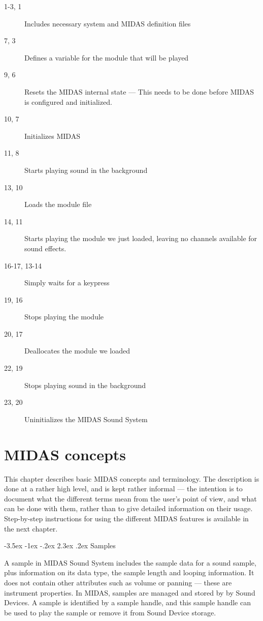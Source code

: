 \documentclass[a4paper,12pt,oneside]{book}
\makeatletter
\renewcommand\section{\@startsection {section}{1}{-20pt}%
                                   {-3.5ex \@plus -1ex \@minus -.2ex}%
                                   {2.3ex \@plus.2ex}%
                                   {\normalfont\Large\bfseries}}
\makeatother
\begin{document}
\begin{description}
    \item [1-3, 1] Includes necessary system and MIDAS definition files
    \item [7, 3] Defines a variable for the module that will be played
    \item [9, 6] Resets the MIDAS internal state --- This needs to be done
        before MIDAS is configured and initialized.
    \item [10, 7] Initializes MIDAS
    \item [11, 8] Starts playing sound in the background
    \item [13, 10] Loads the module file
    \item [14, 11] Starts playing the module we just loaded, leaving no
        channels available for sound effects.
    \item [16-17, 13-14] Simply waits for a keypress
    \item [19, 16] Stops playing the module
    \item [20, 17] Deallocates the module we loaded
    \item [22, 19] Stops playing sound in the background
    \item [23, 20] Uninitializes the MIDAS Sound System
\end{description}




\chapter{MIDAS concepts}

This chapter describes basic MIDAS concepts and terminology. The description
is done at a rather high level, and is kept rather informal --- the intention
is to document what the different terms mean from the user's point of view,
and what can be done with them, rather than to give detailed information on
their usage. Step-by-step instructions for using the different MIDAS features
is available in the next chapter.


\section{Samples}

A sample in MIDAS Sound System includes the sample data for a sound sample,
plus information on its data type, the sample length and looping information.
It does not contain other attributes such as volume or panning --- these are
instrument properties. In MIDAS, samples are managed and stored by by Sound
Devices. A sample is identified by a sample handle, and this sample handle
can be used to play the sample or remove it from Sound Device storage.
\end{document}
